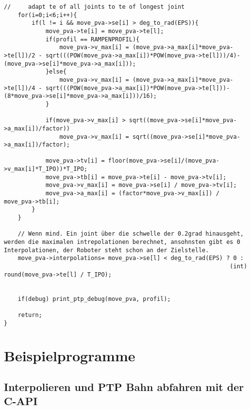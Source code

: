 \documentclass[
a4paper,
12pt,
oneside,
headsepline,		%
footsepline,		%
]{scrbook}
\begin{document}
\begin{lstlisting}
//     adapt te of all joints to te of longest joint
    for(i=0;i<6;i++){
        if(l != i && move_pva->se[i] > deg_to_rad(EPS)){
            move_pva->te[i] = move_pva->te[l];
            if(profil == RAMPENPROFIL){
                move_pva->v_max[i] = (move_pva->a_max[i]*move_pva->te[l])/2 - sqrt(((POW(move_pva->a_max[i])*POW(move_pva->te[l]))/4)-(move_pva->se[i]*move_pva->a_max[i]));
            }else{
                move_pva->v_max[i] = (move_pva->a_max[i]*move_pva->te[l])/4 - sqrt(((POW(move_pva->a_max[i])*POW(move_pva->te[l]))-(8*move_pva->se[i]*move_pva->a_max[i]))/16);
            }

            if(move_pva->v_max[i] > sqrt((move_pva->se[i]*move_pva->a_max[i])/factor))
                move_pva->v_max[i] = sqrt((move_pva->se[i]*move_pva->a_max[i])/factor);

            move_pva->tv[i] = floor(move_pva->se[i]/(move_pva->v_max[i]*T_IPO))*T_IPO;
            move_pva->tb[i] = move_pva->te[i] - move_pva->tv[i];
            move_pva->v_max[i] = move_pva->se[i] / move_pva->tv[i];
            move_pva->a_max[i] = (factor*move_pva->v_max[i]) /  move_pva->tb[i];
        }
    }

    // Wenn mind. Ein joint über die schwelle der 0.2grad hinausgeht, werden die maximalen intrepolationen berechnet, ansohnsten gibt es 0 Interpolationen, der Roboter steht schon an der Zielstelle.
    move_pva->interpolations= move_pva->se[l] < deg_to_rad(EPS) ? 0 :
                                                                 (int) round(move_pva->te[l] / T_IPO);


    if(debug) print_ptp_debug(move_pva, profil);

    return;
}
\end{lstlisting}

\chapter{Beispielprogramme}
\label{bsp_programs}

\section{Interpolieren und PTP Bahn abfahren mit der C-API}
\label{interpolation}
\end{document}
